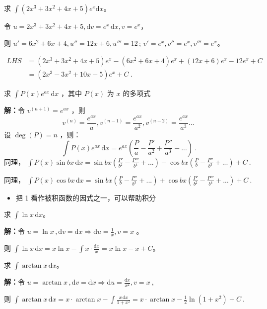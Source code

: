 \begin{example}{}
求 $\displaystyle{\int\left(2x^3+3x^2+4x+5\right)e^x\mathrm {d}x}$。

令 $\displaystyle{u=2x^3+3x^2+4x+5,\mathrm{d}v=e^x\,\mathrm{d}x,v=e^x}$，

则 $\displaystyle{u'=6x^2+6x+4,u''=12x+6,u'''=12\,;\,v'=e^x,v''=e^x,v'''=e^x}$。

\begin{equation}
\begin{aligned}
LHS&=(2x^3+3x^2+4x+5)e^x-(6x^2+6x+4)e^x+(12x+6)e^x-12e^x+C \\
&=(2x^3-3x^2+10x-5)e^x+C~.
\end{aligned}
\end{equation}
\end{example}
\begin{corollary}{}
求 $\displaystyle{\int P(x)e^{ax}\,\mathrm{d}x}$ ，其中 $P(x)$ 为 $x$ 的多项式

\textbf{解：}令 $v^{(n+1)}=e^{ax}$ ，则
$$
v^{(n)}=\frac{e^{ax}}{a},v^{(n-1)}=\frac{e^{ax}}{a^2},v^{(n-2)}=\frac{e^{ax}}{a^3}\dots~
$$ 
设 $\deg (P)=n$ ，则：
$$\int P(x)e^{ax}\,\mathrm{d}x=e^{ax}\left(\frac{P}{a}-\frac{P'}{a^2}+\frac{P''}{a^3}-...\right)~.$$
同理， $\displaystyle{\int P(x)\sin bx\,\mathrm{d}x=\sin bx\left(\frac{P'}{b^2}-\frac{P'''}{b^4}+...\right)-\cos bx\left(\frac{P}{b}-\frac{P''}{b^3}+...\right)+C}~.$

同理， $\displaystyle{\int P(x)\cos bx\,\mathrm{d}x=\sin bx\left(\frac{P}{b}-\frac{P''}{b^3}+...\right)+\cos bx\left(\frac{P'}{b^2}-\frac{P'''}{b^4}+...\right)+C}~.$
\end{corollary}
\begin{itemize}
\item 把 1 看作被积函数的因式之一，可以帮助积分
\end{itemize}
\begin{corollary}{}
求 $\displaystyle{\int \ln x\,\mathrm{d}x}$。

\textbf{解：}令 $\displaystyle{u=\ln x\,,\mathrm{d}v=\mathrm{d}x\Rightarrow \mathrm{d}u=\frac{1}{x},v=x}$ 。

则 $\displaystyle{\int \ln x\,\mathrm{d}x=x\ln x-\int x\cdot\frac{\mathrm{d}x}x=x\ln x-x+C}$。
\end{corollary}

\begin{corollary}{}
求 $\displaystyle{\int\arctan x\,\mathrm{d}x}$。

\textbf{解：}令 $\displaystyle{u=\arctan x\,,\mathrm{d}v=\mathrm{d}x\Rightarrow \mathrm{d}u=\frac{\mathrm{d}x}{x^2},v=x}~,$

则 $\displaystyle{\int\arctan x\,\mathrm{d}x=x\cdot \arctan x-\int\frac{x\,\mathrm{d}x}{1+x^2}=x\cdot \arctan x-\frac{1}{2}\ln\left(1+x^2\right)+C}~.$
\end{corollary}

